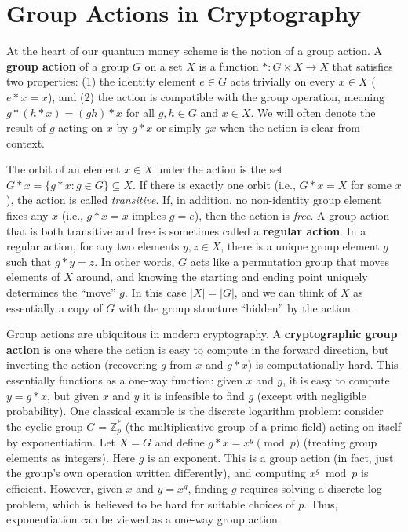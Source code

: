 \documentclass[12pt]{report}
\begin{document}






\section{Group Actions in Cryptography}
At the heart of our quantum money scheme is the notion of a group action. A \textbf{group action} of a group $G$ on a set $X$ is a function $*\colon G \times X \to X$ that satisfies two properties: (1) the identity element $e \in G$ acts trivially on every $x \in X$ ($e * x = x$), and (2) the action is compatible with the group operation, meaning $g*(h* x) = (gh)*x$ for all $g,h \in G$ and $x \in X$. We will often denote the result of $g$ acting on $x$ by $g*x$ or simply $g x$ when the action is clear from context.

The orbit of an element $x \in X$ under the action is the set $G * x = \{g*x : g \in G\} \subseteq X$. If there is exactly one orbit (i.e., $G * x = X$ for some $x$), the action is called \emph{transitive}. If, in addition, no non-identity group element fixes any $x$ (i.e., $g * x = x$ implies $g = e$), then the action is \emph{free}. A group action that is both transitive and free is sometimes called a \textbf{regular action}. In a regular action, for any two elements $y, z \in X$, there is a unique group element $g$ such that $g * y = z$. In other words, $G$ acts like a permutation group that moves elements of $X$ around, and knowing the starting and ending point uniquely determines the “move” $g$. In this case $|X| = |G|$, and we can think of $X$ as essentially a copy of $G$ with the group structure “hidden” by the action.

Group actions are ubiquitous in modern cryptography. A \textbf{cryptographic group action} is one where the action is easy to compute in the forward direction, but inverting the action (recovering $g$ from $x$ and $g*x$) is computationally hard. This essentially functions as a one-way function: given $x$ and $g$, it is easy to compute $y = g*x$, but given $x$ and $y$ it is infeasible to find $g$ (except with negligible probability). One classical example is the discrete logarithm problem: consider the cyclic group $G = \mathbb{Z}_p^*$ (the multiplicative group of a prime field) acting on itself by exponentiation. Let $X = G$ and define $g * x = x^g \pmod p$ (treating group elements as integers). Here $g$ is an exponent. This is a group action (in fact, just the group’s own operation written differently), and computing $x^g \bmod p$ is efficient. However, given $x$ and $y = x^g$, finding $g$ requires solving a discrete log problem, which is believed to be hard for suitable choices of $p$. Thus, exponentiation can be viewed as a one-way group action.
\end{document}
